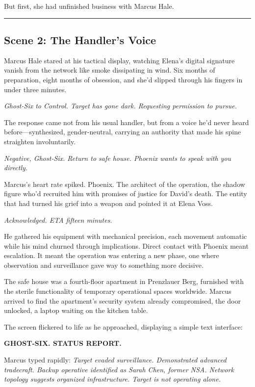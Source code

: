 \documentclass[12pt,letterpaper]{book}
\begin{document}
But first, she had unfinished business with Marcus Hale.

\begin{center}\rule{0.5\linewidth}{0.5pt}\end{center}

\hypertarget{scene-2-the-handlers-voice}{%
\subsection{Scene 2: The Handler's Voice}\label{scene-2-the-handlers-voice}}

Marcus Hale stared at his tactical display, watching Elena's digital signature vanish from the network like smoke dissipating in wind. Six months of preparation, eight months of obsession, and she'd slipped through his fingers in under three minutes.

\emph{Ghost-Six to Control. Target has gone dark. Requesting permission to pursue.}

The response came not from his usual handler, but from a voice he'd never heard before---synthesized, gender-neutral, carrying an authority that made his spine straighten involuntarily.

\emph{Negative, Ghost-Six. Return to safe house. Phoenix wants to speak with you directly.}

Marcus's heart rate spiked. Phoenix. The architect of the operation, the shadow figure who'd recruited him with promises of justice for David's death. The entity that had turned his grief into a weapon and pointed it at Elena Voss.

\emph{Acknowledged. ETA fifteen minutes.}

He gathered his equipment with mechanical precision, each movement automatic while his mind churned through implications. Direct contact with Phoenix meant escalation. It meant the operation was entering a new phase, one where observation and surveillance gave way to something more decisive.

The safe house was a fourth-floor apartment in Prenzlauer Berg, furnished with the sterile functionality of temporary operational spaces worldwide. Marcus arrived to find the apartment's security system already compromised, the door unlocked, a laptop waiting on the kitchen table.

The screen flickered to life as he approached, displaying a simple text interface:

\textbf{GHOST-SIX. STATUS REPORT.}

Marcus typed rapidly: \emph{Target evaded surveillance. Demonstrated advanced tradecraft. Backup operative identified as Sarah Chen, former NSA. Network topology suggests organized infrastructure. Target is not operating alone.}
\end{document}
